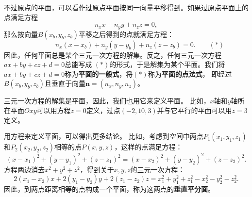 \documentclass[12pt,UTF8]{ctexbook}
\begin{document}
不过原点的平面，可以看作过原点平面按同一向量平移得到。如果过原点平面上的点满足方程
$$ n_xx + n_yy + n_zz = 0, $$
那么按向量$B(x_b, y_b,z_b)$平移之后得到的点就满足方程：
$$ \mbox{}\qquad\qquad n_x(x - x_b) + n_y(y - y_b) + n_z(z - z_b) = 0. \quad\quad (*)$$
因此，任何平面总是某个三元一次方程的解集。反之，任何三元一次方程$ax+by+cz+d = 0$总能写成
$(*)$的形式，于是解集为某个平面。我们将$ax+by+cz+d = 0$称为\textbf{平面的一般式}，将$(*)$称为\textbf{平面的点法式}，
即经过$B(x_b, y_b,z_b)$且垂直于向量$\mathbf{n} = (n_x, n_y, n_z)$。

三元一次方程的解集是平面，因此，我们也用它来定义平面。
比如，$x$轴和$y$轴所在平面$Oxy$可以用方程$z = 0$定义，过点$(-2,10,3)$并与它平行的平面可以用$z = 3$定义。	

用方程来定义平面，可以得出更多结论。
比如，考虑到空间中两点$P_1(x_1, y_1, z_1)$和$P_2(x_2, y_2, z_2)$相等的点$P(x,y,z)$，这样的点满足方程：
$$ (x - x_1)^2 + (y - y_1)^2 + (z - z_1)^2 = (x - x_2)^2 + (y - y_2)^2 + (z - z_2)^2. $$
方程两边消去$x^2 + y^2 + z^2$，得到关于$x,y,z$的三元一次方程：
$$ 2(x_1-x_2)x + 2(y_1-y_2)y + 2(z_1-z_2)z = x_1^2+y_1^2+z_1^2 - x_2^2-y_2^2-z_2^2. $$
因此，到两点距离相等的点构成一个平面，称为这两点的\textbf{垂直平分面}。
\end{document}
